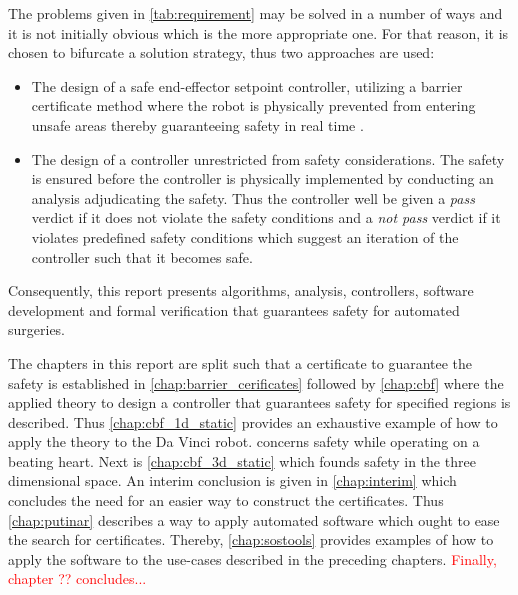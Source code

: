 The problems given in \autoref{tab:requirement} may be solved in a number of ways and it is not initially obvious which is the more appropriate one. For that reason, it is chosen to bifurcate a solution strategy, thus two approaches are used:
\begin{itemize}
\item The design of a safe end-effector setpoint controller, utilizing a barrier certificate method where the robot is physically prevented from entering unsafe areas thereby guaranteeing safety in real time \citep{bib:safety}. 
\item The design of a controller unrestricted from safety considerations. The safety is ensured before the controller is physically implemented by conducting an analysis adjudicating the safety. Thus the controller well be given a \textit{pass} verdict if it does not violate the safety conditions and a \textit{not pass} verdict if it violates predefined safety conditions which suggest an iteration of the controller such that it becomes safe. 
\end{itemize}
Consequently, this report presents algorithms, analysis, controllers, software development and formal verification that guarantees safety for automated surgeries.

The chapters in this report are split such that a certificate to guarantee the safety is established in \autoref{chap:barrier_cerificates} followed by \autoref{chap:cbf} where the applied theory to design a controller that guarantees safety for specified regions is described. Thus \autoref{chap:cbf_1d_static} provides an exhaustive example of how to apply the theory to the Da Vinci robot.  concerns safety while operating on a beating heart. Next is \autoref{chap:cbf_3d_static} which founds safety in the three dimensional space. An interim conclusion is given in \autoref{chap:interim} which concludes the need for an easier way to construct the certificates. Thus \autoref{chap:putinar} describes a way to apply automated software which ought to ease the search for certificates. Thereby, \autoref{chap:sostools} provides examples of how to apply the software to the use-cases described in the preceding chapters. \textcolor{red}{Finally, chapter ?? concludes...}





